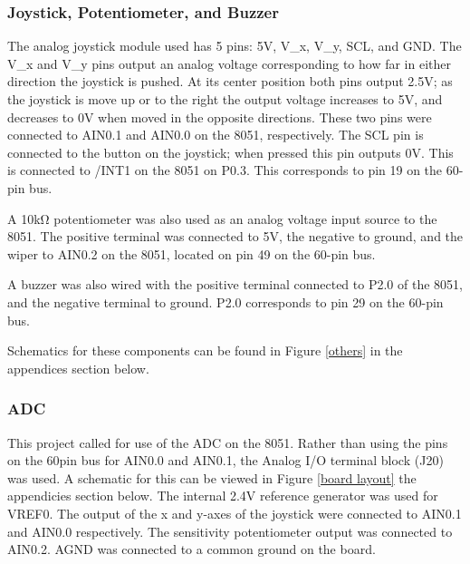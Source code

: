 \documentclass[12pt]{article}
\begin{document}
\subsubsection{Joystick, Potentiometer, and Buzzer}
The analog joystick module used has 5 pins: 5\si{V}, V\_x, V\_y, SCL, and GND. The V\_x and V\_y pins output an analog voltage corresponding to how far in either direction the joystick is pushed. At its center position both pins output 2.5\si{V}; as the joystick is move up or to the right the output voltage increases to 5V, and decreases to 0V when moved in the opposite directions. These two pins were connected to AIN0.1 and AIN0.0 on the 8051, respectively. The SCL pin is connected to the button on the joystick; when pressed this pin outputs 0\si{V}. This is connected to /INT1 on the 8051 on P0.3. This corresponds to pin 19 on the 60-pin bus. 

A 10k\si{\ohm} potentiometer was also used as an analog voltage input source to the 8051. The positive terminal was connected to 5\si{V}, the negative to ground, and the wiper to AIN0.2 on the 8051, located on pin 49 on the 60-pin bus. 

A buzzer was also wired with the positive terminal connected to P2.0 of the 8051, and the negative terminal to ground. P2.0 corresponds to pin 29 on the 60-pin bus. 

Schematics for these components can be found in Figure \ref{others} in the appendices section below. 

\subsubsection{ADC}
This project called for use of the ADC on the 8051. Rather than using the pins on the 60pin bus for AIN0.0 and AIN0.1, the Analog I/O terminal block (J20) was used. A schematic for this can be viewed in Figure \ref{board layout} the appendicies section below. The internal 2.4\si{V} reference generator was used for VREF0. The output of the x and y-axes of the joystick were connected to AIN0.1 and AIN0.0 respectively. The sensitivity potentiometer output was connected to AIN0.2. AGND was connected to a common ground on the board. 
\end{document}
